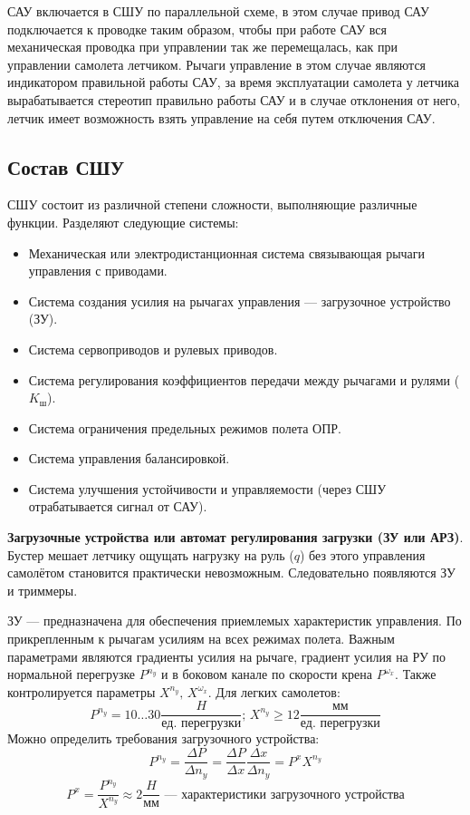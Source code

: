 \documentclass{article}
\begin{document}
САУ включается в СШУ по параллельной схеме, в этом случае привод САУ
подключается к проводке таким образом, чтобы при работе САУ вся механическая
проводка при управлении так же перемещалась, как при управлении самолета
летчиком. Рычаги управление в этом случае являются индикатором правильной
работы САУ, за время эксплуатации самолета у летчика вырабатывается стереотип
правильно работы САУ и в случае отклонения от него, летчик имеет возможность
взять управление на себя путем отключения САУ.
\newpage

\subsection{Состав СШУ}
СШУ состоит из различной степени сложности, выполняющие различные функции.
Разделяют следующие системы:
\begin{itemize}
	\item Механическая или электродистанционная система связывающая рычаги
	      управления с приводами.
	\item Система создания усилия на рычагах управления --- загрузочное
	      устройство (ЗУ).
	\item Система сервоприводов и рулевых приводов.
	\item Система регулирования коэффициентов передачи между рычагами и рулями
	      ($K_\text{ш}$).
	\item Система ограничения предельных режимов полета ОПР.
	\item Система управления балансировкой.
	\item Система улучшения устойчивости и управляемости (через СШУ
	      отрабатывается сигнал от САУ).
\end{itemize}

\textbf{Загрузочные устройства или автомат регулирования загрузки (ЗУ или
	АРЗ)}. Бустер мешает летчику ощущать нагрузку на руль ($q$) без этого
управления самолётом становится практически невозможным. Следовательно
появляются ЗУ и триммеры.

ЗУ --- предназначена для обеспечения приемлемых характеристик управления. По
прикрепленным к рычагам усилиям на всех режимах полета. Важным параметрами
являются градиенты усилия на рычаге, градиент усилия на РУ по нормальной
перегрузке $P^{n_y}$ и в боковом канале по скорости крена $P^{\omega_x}$. Также
контролируется параметры $X^{n_y},\, X^{\omega_x}$. Для легких самолетов:
\[
	P^{n_y} =10 \dots 30 \frac{H}{\text{ед. перегрузки}};\, X^{n_y} \ge 12
	\frac{\text{мм}}{\text{ед. перегрузки}}
\]
Можно определить требования загрузочного устройства:
\[
	P^{n_y} = \frac{\Delta P}{\Delta n_y} = \frac{\Delta P}{\Delta x}
	\frac{\Delta x}{\Delta n_y} = P^{x} X^{n_y}
\]
\[
	P^{x} = \frac{P^{n_y}}{X^{n_y}} \approx 2 \frac{H}{\text{мм}} \text{ ---
		характеристики загрузочного устройства}
\]
\end{document}
